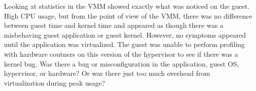 \indent Looking at statistics in the VMM showed exactly what was noticed on the guest.  High CPU usage, but from the point of view of the VMM, there was no difference between guest time and kernel time and appeared as though there was a misbehaving guest application or guest kernel.  However, no symptoms appeared until the application was virtualized.  The guest was unable to perform profiling with hardware coutners on this version of the hypervisor \cite{serebrin} to see if there was a kernel bug.  Was there a bug or misconfiguration in the application, guest OS, hypervisor, or hardware?  Or was there just too much overhead from virtualization during peak usage?
